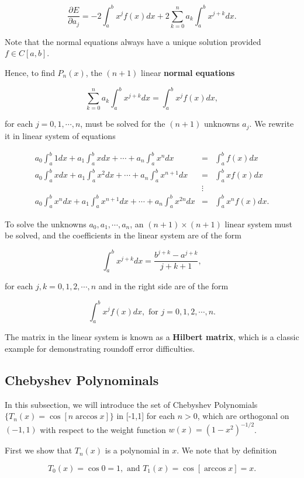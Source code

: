 \documentclass[preprint,12pt]{elsarticle}
\begin{document}
\[
 \frac{\partial E}{\partial a_j}=-2\int_a^bx^jf(x)dx+2\sum_{k=0}^n a_k \int_a^b x^{j+k} dx.
\]

Note that the normal equations always have a unique solution provided $f\in C[a, b]$.

Hence, to find $P_n(x)$, the $(n+1)$ linear \textbf{normal equations}

\[
\sum_{k=0}^n a_k \int_a^b x^{j+k}dx=\int_a^b x^jf(x)dx,
\]

for each $j=0,1,\cdots,n$, must be solved for the $(n + 1)$ unknowns $a_j$. We rewrite it in linear system of equations

\begin{eqnarray*}
a_0 \int_a^b1dx+a_1\int_a^bxdx+\cdots+a_n\int_a^bx^ndx & = & \int_a^bf(x)dx \\
a_0 \int_a^bxdx+a_1\int_a^bx^2dx+\cdots+a_n\int_a^bx^{n+1}dx & = & \int_a^bxf(x)dx \\
& \vdots &  \\
a_0\int_a^bx^ndx+a_1\int_a^bx^{n+1}dx+\cdots+a_n\int_a^bx^{2n}dx & = & \int_a^bx^nf(x)dx.
\end{eqnarray*}

To solve the unknowns $a_0,a_1,\cdots,a_n$, an $(n + 1)\times (n + 1)$ linear system  must be solved, and the coefficients in the linear system are of the form

\[
\int_a^b x^{j+k} dx=\frac{b^{j+k}-a^{j+k}}{j+k+1},
\]

for each $j,k=0,1,2,\cdots,n$ and in the right side are of the form

\[
\int_a^bx^j f(x)dx,\text{ for } j=0,1,2,\cdots,n.
\]

The matrix in the linear system is known as a \textbf{Hilbert matrix}, which is a classic example for demonstrating roundoff error difficulties.

\subsection{Chebyshev Polynominals}
\label{SS:2.3}

In this subsection, we will introduce the set of Chebyshev Polynomials $\{T_n(x)=\cos[n\arccos x]\}$ in [-1,1] for each $n>0$, which are orthogonal on $(-1,1)$ with respect to the weight function $w(x)=(1-x^2)^{-1/2}$.

First we show that $T_n(x)$ is a polynomial in $x$. We note that by definition

\[
T_0(x)=\cos 0=1, \text{ and }  T_1(x)=\cos[\arccos x]=x.
\]
\end{document}
